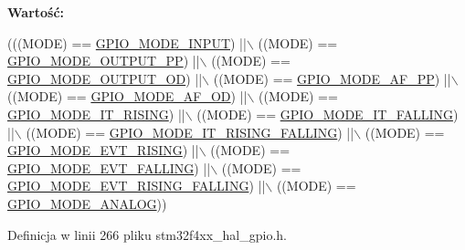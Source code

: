 {\bfseries Wartość\+:}
\begin{DoxyCode}
(((MODE) == \hyperlink{group___g_p_i_o__mode__define_gaf40bec3146810028a84b628d37d3b391}{GPIO\_MODE\_INPUT})              ||\(\backslash\)
                            ((MODE) == \hyperlink{group___g_p_i_o__mode__define_ga1013838a64cec2f8c88f079c449d1982}{GPIO\_MODE\_OUTPUT\_PP})          ||\(\backslash\)
                            ((MODE) == \hyperlink{group___g_p_i_o__mode__define_ga2f91757829f6e9505ec386b840941929}{GPIO\_MODE\_OUTPUT\_OD})          ||\(\backslash\)
                            ((MODE) == \hyperlink{group___g_p_i_o__mode__define_ga526c72c5264316fc05c775b6cad4aa6a}{GPIO\_MODE\_AF\_PP})              ||\(\backslash\)
                            ((MODE) == \hyperlink{group___g_p_i_o__mode__define_ga282b9fd37c8ef31daba314ffae6bf023}{GPIO\_MODE\_AF\_OD})              ||\(\backslash\)
                            ((MODE) == \hyperlink{group___g_p_i_o__mode__define_ga088659562e68426d9a72821ea4fd8d50}{GPIO\_MODE\_IT\_RISING})          ||\(\backslash\)
                            ((MODE) == \hyperlink{group___g_p_i_o__mode__define_gaa166210a6da3ac7e8d7504702520e522}{GPIO\_MODE\_IT\_FALLING})         ||\(\backslash\)
                            ((MODE) == \hyperlink{group___g_p_i_o__mode__define_ga0678e61090ed61e91a6496f22ddfb3d1}{GPIO\_MODE\_IT\_RISING\_FALLING})  ||\(\backslash\)
                            ((MODE) == \hyperlink{group___g_p_i_o__mode__define_ga97d78b82ea178ff7a4c35aa60b4e9338}{GPIO\_MODE\_EVT\_RISING})         ||\(\backslash\)
                            ((MODE) == \hyperlink{group___g_p_i_o__mode__define_gadbfa532b3566783ac6c0e07c2e0ffe5e}{GPIO\_MODE\_EVT\_FALLING})        ||\(\backslash\)
                            ((MODE) == \hyperlink{group___g_p_i_o__mode__define_ga1b760771297ed2fc55a6b13071188491}{GPIO\_MODE\_EVT\_RISING\_FALLING}) ||\(\backslash\)
                            ((MODE) == \hyperlink{group___g_p_i_o__mode__define_ga7a04f9ab65ad572ad20791a35009220c}{GPIO\_MODE\_ANALOG}))
\end{DoxyCode}


Definicja w linii 266 pliku stm32f4xx\+\_\+hal\+\_\+gpio.\+h.

\mbox{\label{group___g_p_i_o___private___macros_gad6ec74e33360395535ad5d91ba6d4781}} 
